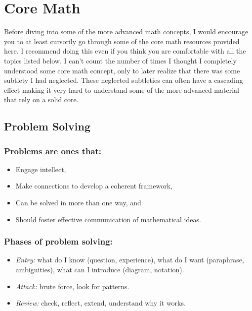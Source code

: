 \hypertarget{core-math}{%
\section{Core Math}\label{core-math}}

Before diving into some of the more advanced math concepts, I would
encourage you to at least cursorily go through some of the core math
resources provided here. I recommend doing this even if you think you
are comfortable with all the topics listed below. I can't count the
number of times I thought I completely understood some core math
concept, only to later realize that there was some subtlety I had
neglected. These neglected subtleties can often have a cascading effect
making it very hard to understand some of the more advanced material
that rely on a solid core.

\hypertarget{problem-solving}{%
\subsection{Problem Solving}\label{problem-solving}}

\hypertarget{problems-are-ones-that}{%
\subsubsection{Problems are ones that:}\label{problems-are-ones-that}}

\begin{itemize}
\tightlist
\item
  Engage intellect,
\item
  Make connections to develop a coherent framework,
\item
  Can be solved in more than one way, and
\item
  Should foster effective communication of mathematical ideas.
\end{itemize}

\hypertarget{phases-of-problem-solving}{%
\subsubsection{Phases of problem
solving:}\label{phases-of-problem-solving}}

\begin{itemize}
\tightlist
\item
  \emph{Entry:} what do I know (question, experience), what do I want
  (paraphrase, ambiguities), what can I introduce (diagram, notation).
\item
  \emph{Attack:} brute force, look for patterns.
\item
  \emph{Review:} check, reflect, extend, understand why it works.
\end{itemize}

